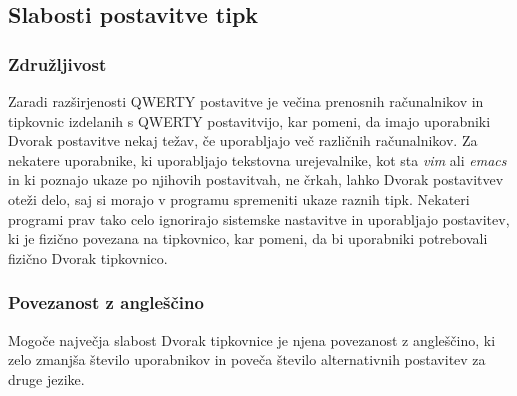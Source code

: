     \subsection{Slabosti postavitve tipk}\label{subsec:slabosti-postavitve-tipk}

    \subsubsection{Združljivost}

    Zaradi razširjenosti QWERTY postavitve je večina prenosnih računalnikov in tipkovnic izdelanih s QWERTY postavitvijo,
    kar pomeni, da imajo uporabniki Dvorak postavitve nekaj težav, če uporabljajo več različnih računalnikov.
    Za nekatere uporabnike, ki uporabljajo tekstovna urejevalnike, kot sta \emph{vim} ali \emph{emacs}
    in ki poznajo ukaze po njihovih postavitvah, ne črkah, lahko Dvorak postavitvev oteži delo,
    saj si morajo v programu spremeniti ukaze raznih tipk.
    Nekateri programi prav tako celo ignorirajo sistemske nastavitve in uporabljajo postavitev,
    ki je fizično povezana na tipkovnico, kar pomeni, da bi uporabniki potrebovali fizično Dvorak tipkovnico.

    \subsubsection{Povezanost z angleščino}

    Mogoče največja slabost Dvorak tipkovnice je njena povezanost z angleščino,
    ki zelo zmanjša število uporabnikov in poveča število alternativnih postavitev za druge jezike.

